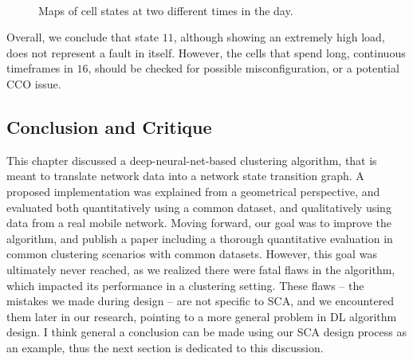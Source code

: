 			\begin{figure}[ht]
				\centering
				\\				
				\caption[Maps of cell states at two different times in the day]{Maps of cell states at two different times in the day.}
				\label{fig:maps}
			\end{figure}
			
			Overall, we conclude that state $11$, although showing an extremely high load, does not represent a fault in itself.
			However, the cells that spend long, continuous timeframes in $16$, should be checked for possible misconfiguration, or a potential \ac{CCO} issue.
			
		\subsection{Conclusion and Critique}
		
			This chapter discussed a deep-neural-net-based clustering algorithm, that is meant to translate network data into a network state transition graph.
			A proposed implementation was explained from a geometrical perspective, and evaluated both quantitatively using a common dataset, and qualitatively using data from a real mobile network.			
			Moving forward, our goal was to improve the algorithm, and publish a paper including a thorough quantitative evaluation in common clustering scenarios with common datasets.
			However, this goal was ultimately never reached, as we realized there were fatal flaws in the algorithm, which impacted its performance in a clustering setting.
			These flaws -- the mistakes we made during design -- are not specific to \ac{SCA}, and we encountered them later in our research, pointing to a more general problem in \ac{DL} algorithm design.
			I think general a conclusion can be made using our \ac{SCA} design process as an example, thus the next section is dedicated to this discussion.
	
